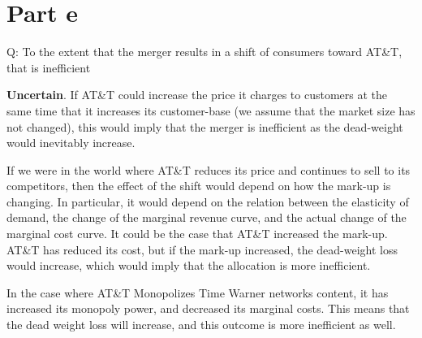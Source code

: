 \documentclass[12pt]{paper}
\begin{document}





\section*{Part e}
Q: To the extent that the merger results in a shift
  of consumers toward AT\&T, that is inefficient


\textbf{Uncertain}. If AT\&T could increase the price it charges to
customers at the same time that it increases its customer-base (we
assume that the market size has not changed), this would imply that
the merger is inefficient as the dead-weight would inevitably
increase.


If we were in the world where AT\&T reduces its price and continues to
sell to its competitors, then the effect of the shift would depend on
how the mark-up is changing. In particular, it would depend on the
relation between the elasticity of demand, the change of the marginal
revenue curve, and the actual change of the marginal cost curve. It
could be the case that AT\&T increased the mark-up. AT\&T has reduced
its cost, but if the mark-up increased, the dead-weight loss would
increase, which would imply that the allocation is more inefficient.


In the case where AT\&T Monopolizes Time Warner networks content, it
has increased its monopoly power, and decreased its marginal
costs. This means that the dead weight loss will increase, and this
outcome is more inefficient as well.
\end{document}
